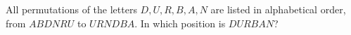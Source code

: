 All permutations of the letters $D,U,R,B,A,N$ are listed in alphabetical order, from $ABDNRU$ to $URNDBA$. In which position is $DURBAN$?
